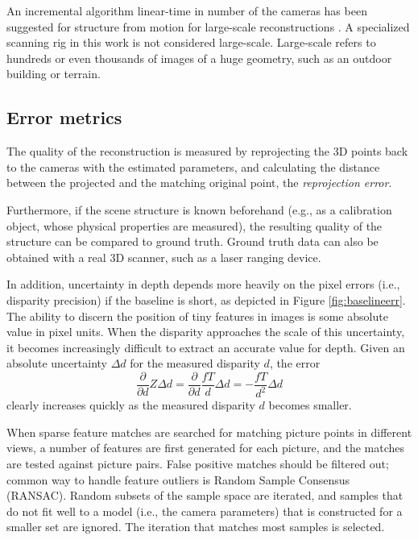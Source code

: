 An incremental algorithm linear-time in number of the cameras has been suggested for structure from motion for large-scale reconstructions \cite{wu2013towards}.
A specialized scanning rig in this work is not considered large-scale.
Large-scale refers to hundreds or even thousands of images of a huge geometry, such as an outdoor building or terrain.


\subsection{Error metrics} %

The quality of the reconstruction is measured by reprojecting the 3D points back to the cameras with the estimated parameters, and calculating the distance between the projected and the matching original point, the \emph{reprojection error}. \cite[p. 95]{hartley03multiview}

Furthermore, if the scene structure is known beforehand (e.g., as a calibration object, whose physical properties are measured), the resulting quality of the structure can be compared to ground truth.
Ground truth data can also be obtained with a real 3D scanner, such as a laser ranging device. %

In addition, uncertainty in depth depends more heavily on the pixel errors (i.e., disparity precision) if the baseline is short, as depicted in Figure \ref{fig:baselineerr}.
The ability to discern the position of tiny features in images is some absolute value in pixel units.
When the disparity approaches the scale of this uncertainty, it becomes increasingly difficult to extract an accurate value for depth.
Given an absolute uncertainty $\Delta d$ for the measured disparity $d$, the error
\begin{equation}
	\frac{\partial}{\partial d} Z \Delta d =
	\frac{\partial}{\partial d} \frac{fT}{d} \Delta d =
	-\frac{fT}{d^2} \Delta d
\end{equation}
clearly increases quickly as the measured disparity $d$ becomes smaller.


When sparse feature matches are searched for matching picture points in different views, a number of features are first generated for each picture, and the matches are tested against picture pairs.
False positive matches should be filtered out; common way to handle feature outliers is Random Sample Consensus (RANSAC).
Random subsets of the sample space are iterated, and samples that do not fit well to a model (i.e., the camera parameters) that is constructed for a smaller set are ignored.
The iteration that matches most samples is selected. \cite{hartley03multiview}

